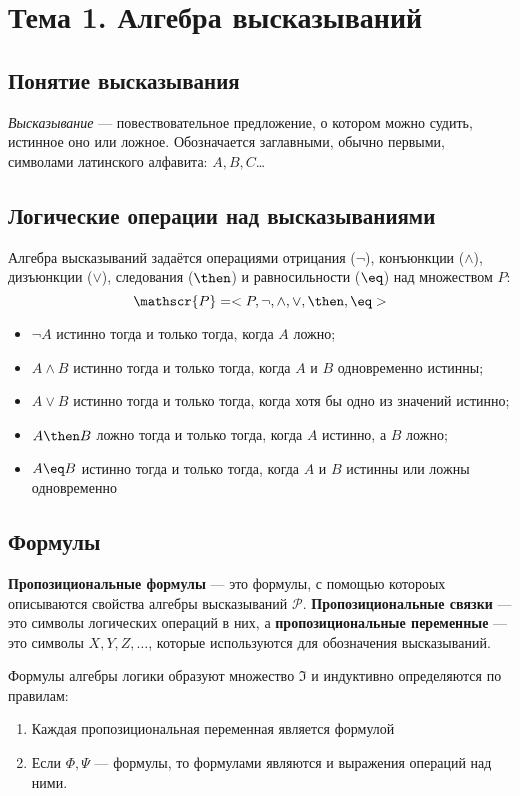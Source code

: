 \section{Тема 1. Алгебра высказываний}
\subsection{Понятие высказывания}
\dftion \textit{Высказывание} --- повествовательное предложение, о котором можно судить, истинное оно или ложное. Обозначается заглавными, обычно первыми, символами латинского алфавита: $A, B, C$\dots
\subsection{Логические операции над высказываниями}
Алгебра высказываний задаётся операциями отрицания ($\lnot$), конъюнкции ($\land$), дизъюнкции ($\lor$), следования ($\then$) и равносильности ($\eq$) над множеством $P$:
\begin{equation}
    \mathscr{P} = <P, \lnot, \land, \lor, \then, \eq>
\end{equation}

\begin{itemize}
    \item $\lnot A$ истинно тогда и только тогда, когда $A$ ложно;
    \item $A \land B$ истинно тогда и только тогда, когда $A$ и $B$ одновременно истинны;
    \item $A \lor B$ истинно тогда и только тогда, когда хотя бы одно из значений истинно;
    \item $A \then B$ ложно тогда и только тогда, когда $A$ истинно, а $B$ ложно;
    \item $A \eq B$ истинно тогда и только тогда, когда $A$ и $B$ истинны или ложны одновременно
\end{itemize}
\subsection{Формулы}
\dftion \textbf{Пропозициональные формулы} --- это формулы, с помощью котороых описываются свойства алгебры высказываний $\mathscr{P}$. \textbf{Пропозициональные связки} --- это символы логических операций в них, а \textbf{пропозициональные переменные} --- это символы $X, Y, Z, \dots$, которые используются для обозначения высказываний.

\dftion Формулы алгебры логики образуют множество $\mathfrak I$ и индуктивно определяются по правилам:
\begin{enumerate}
    \item Каждая пропозициональная переменная является формулой
    \item Если $\Phi, \Psi$ --- формулы, то формулами являются и выражения операций над ними.
\end{enumerate}

